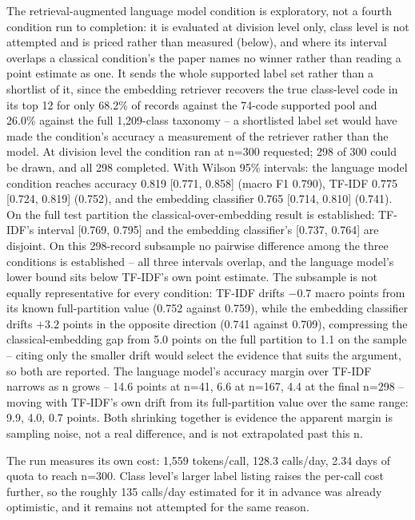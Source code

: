 \documentclass[conference]{IEEEtran}
\begin{document}




The retrieval-augmented language model condition is exploratory, not a
fourth condition run to completion: it is evaluated at division level
only, class level is not attempted and is priced rather than measured
(below), and where its interval overlaps a classical condition's the
paper names no winner rather than reading a point estimate as one. It
sends the whole supported label set rather than a shortlist of it,
since the embedding
retriever recovers the true class-level code in its top 12 for only
68.2\% of records against the 74-code supported pool and 26.0\% against
the full 1,209-class taxonomy -- a shortlisted label set would have
made the condition's accuracy a measurement of the retriever rather
than the model. At division level the condition ran at n=300
requested; 298 of 300 could be drawn, and all 298 completed. With
Wilson 95\% intervals: the language model condition reaches accuracy
0.819 [0.771, 0.858] (macro F1 0.790), TF-IDF 0.775 [0.724, 0.819]
(0.752), and the embedding classifier 0.765 [0.714, 0.810] (0.741).
On the full test partition the classical-over-embedding result is
established: TF-IDF's interval [0.769, 0.795] and the embedding
classifier's [0.737, 0.764] are disjoint. On this 298-record
subsample no pairwise difference among the three conditions is
established -- all three intervals overlap, and the language model's
lower bound sits below TF-IDF's own point estimate. The subsample is
not equally representative for every condition: TF-IDF drifts $-0.7$
macro points from its known full-partition value (0.752 against
0.759), while the embedding classifier drifts $+3.2$ points in the
opposite direction (0.741 against 0.709), compressing the
classical-embedding gap from 5.0 points on the full partition to 1.1
on the sample -- citing only the smaller drift would select the
evidence that suits the argument, so both are reported. The language
model's accuracy margin over TF-IDF narrows as n grows -- 14.6 points
at n=41, 6.6 at n=167, 4.4 at the final n=298 -- moving with TF-IDF's
own drift from its full-partition value over the same range: 9.9, 4.0,
0.7 points. Both shrinking together is evidence the apparent margin is
sampling noise, not a real difference, and is not extrapolated past
this n.

The run measures its own cost: 1,559 tokens/call, 128.3 calls/day, 2.34
days of quota to reach n=300. Class level's larger label
listing raises the per-call cost further, so the roughly 135
calls/day estimated for it in advance was already optimistic, and it
remains not attempted for the same reason.
\end{document}
